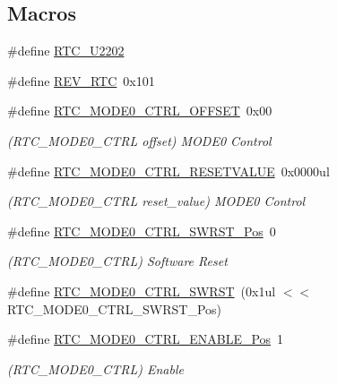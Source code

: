 \subsection*{Macros}
\begin{DoxyCompactItemize}
\item 
\#define \mbox{\hyperlink{group___s_a_m_d21___r_t_c_gad5fab06b6f6290bbd429e2d007f7636e}{R\+T\+C\+\_\+\+U2202}}
\item 
\#define \mbox{\hyperlink{group___s_a_m_d21___r_t_c_gaff3debc3f3d16a4371e67a802f343c4e}{R\+E\+V\+\_\+\+R\+TC}}~0x101
\item 
\#define \mbox{\hyperlink{group___s_a_m_d21___r_t_c_gad3734593a2636a775c85f7cf3cb9dbd0}{R\+T\+C\+\_\+\+M\+O\+D\+E0\+\_\+\+C\+T\+R\+L\+\_\+\+O\+F\+F\+S\+ET}}~0x00
\begin{DoxyCompactList}\small\item\em (R\+T\+C\+\_\+\+M\+O\+D\+E0\+\_\+\+C\+T\+RL offset) M\+O\+D\+E0 Control \end{DoxyCompactList}\item 
\#define \mbox{\hyperlink{group___s_a_m_d21___r_t_c_ga95bf3f07799c419de2c74c02fc263442}{R\+T\+C\+\_\+\+M\+O\+D\+E0\+\_\+\+C\+T\+R\+L\+\_\+\+R\+E\+S\+E\+T\+V\+A\+L\+UE}}~0x0000ul
\begin{DoxyCompactList}\small\item\em (R\+T\+C\+\_\+\+M\+O\+D\+E0\+\_\+\+C\+T\+RL reset\+\_\+value) M\+O\+D\+E0 Control \end{DoxyCompactList}\item 
\#define \mbox{\hyperlink{group___s_a_m_d21___r_t_c_ga36e07cd73e15ec9a595fd20c5e23b250}{R\+T\+C\+\_\+\+M\+O\+D\+E0\+\_\+\+C\+T\+R\+L\+\_\+\+S\+W\+R\+S\+T\+\_\+\+Pos}}~0
\begin{DoxyCompactList}\small\item\em (R\+T\+C\+\_\+\+M\+O\+D\+E0\+\_\+\+C\+T\+RL) Software Reset \end{DoxyCompactList}\item 
\#define \mbox{\hyperlink{group___s_a_m_d21___r_t_c_gadf40d5c4d1d8909a0cf9efd18b7a207a}{R\+T\+C\+\_\+\+M\+O\+D\+E0\+\_\+\+C\+T\+R\+L\+\_\+\+S\+W\+R\+ST}}~(0x1ul $<$$<$ R\+T\+C\+\_\+\+M\+O\+D\+E0\+\_\+\+C\+T\+R\+L\+\_\+\+S\+W\+R\+S\+T\+\_\+\+Pos)
\item 
\#define \mbox{\hyperlink{group___s_a_m_d21___r_t_c_ga6886ed4aa84075baf24831c1ed5d4cb4}{R\+T\+C\+\_\+\+M\+O\+D\+E0\+\_\+\+C\+T\+R\+L\+\_\+\+E\+N\+A\+B\+L\+E\+\_\+\+Pos}}~1
\begin{DoxyCompactList}\small\item\em (R\+T\+C\+\_\+\+M\+O\+D\+E0\+\_\+\+C\+T\+RL) Enable \end{DoxyCompactList}\item 
$$
\end{DoxyCompactItemize}
